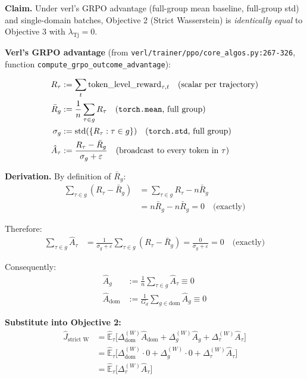 \documentclass{article}
\begin{document}
\textbf{Claim.} Under verl's GRPO advantage (full-group mean baseline,
full-group std) and single-domain batches, Objective 2 (Strict Wasserstein)
is \emph{identically equal} to Objective 3 with $\lambda_{\text{Tj}} = 0$.

\textbf{Verl's GRPO advantage} (from
\texttt{verl/trainer/ppo/core\_algos.py:267-326}, function
\texttt{compute\_grpo\_outcome\_advantage}):

\begin{align}
R_\tau &:= \sum_{t} \text{token\_level\_reward}_{\tau,t} \quad \text{(scalar per trajectory)} \\
\bar R_g &:= \frac{1}{n}\sum_{\tau \in g} R_\tau \quad \text{(\texttt{torch.mean}, full group)} \\
\sigma_g &:= \operatorname{std}(\{R_\tau : \tau \in g\}) \quad \text{(\texttt{torch.std}, full group)} \\
\hat A_\tau &:= \frac{R_\tau - \bar R_g}{\sigma_g + \varepsilon} \quad \text{(broadcast to every token in \(\tau\))}
\end{align}

\textbf{Derivation.} By definition of $\bar R_g$:
\begin{align}
\sum_{\tau \in g} (R_\tau - \bar R_g)
&= \sum_{\tau \in g} R_\tau - n \bar R_g \\
&= n \bar R_g - n \bar R_g = 0 \quad \text{(exactly)}
\end{align}

Therefore:
\begin{align}
\sum_{\tau \in g} \hat A_\tau
&= \frac{1}{\sigma_g + \varepsilon} \sum_{\tau \in g} (R_\tau - \bar R_g)
 = \frac{0}{\sigma_g + \varepsilon} = 0 \quad \text{(exactly)}
\end{align}

Consequently:
\begin{align}
\hat A_g     &:= \frac{1}{n} \sum_{\tau \in g} \hat A_\tau \equiv 0 \\
\hat A_{\text{dom}} &:= \frac{1}{G_d} \sum_{g \in \text{dom}} \hat A_g \equiv 0
\end{align}

\textbf{Substitute into Objective 2:}
\begin{align}
\hat J_{\text{strict W}}
&= \widehat{\mathbb{E}}_\tau \bigl[\Delta_{\text{dom}}^{(W)} \hat A_{\text{dom}}
        + \Delta_g^{(W)} \hat A_g
        + \Delta_\tau^{(W)} \hat A_\tau \bigr] \\
&= \widehat{\mathbb{E}}_\tau \bigl[\Delta_{\text{dom}}^{(W)} \cdot 0
        + \Delta_g^{(W)} \cdot 0
        + \Delta_\tau^{(W)} \hat A_\tau \bigr] \\
&= \widehat{\mathbb{E}}_\tau \bigl[\Delta_\tau^{(W)} \hat A_\tau \bigr]
\end{align}
\end{document}
